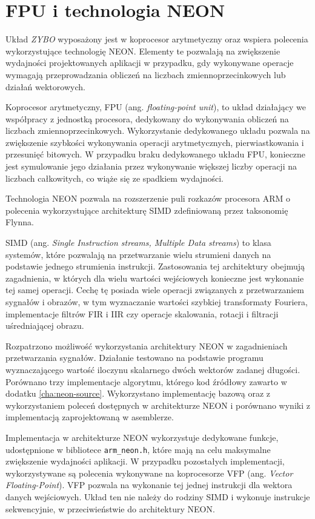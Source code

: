 \section{FPU i technologia NEON}
\label{sec:arm-neon}
Układ \emph{ZYBO} wyposażony jest w koprocesor arytmetyczny oraz wspiera polecenia wykorzystujące technologię NEON. \cite{neon-home} Elementy te pozwalają na zwiększenie wydajności projektowanych aplikacji w przypadku, gdy wykonywane operacje wymagają przeprowadzania obliczeń na liczbach zmiennoprzecinkowych lub działań wektorowych.

Koprocesor arytmetyczny, FPU (ang. \emph{floating-point unit}), to układ działający we współpracy z jednostką procesora, dedykowany do wykonywania obliczeń na liczbach zmiennoprzecinkowych. Wykorzystanie dedykowanego układu pozwala na zwiększenie szybkości wykonywania operacji arytmetycznych, pierwiastkowania i przesunięć bitowych. W przypadku braku dedykowanego układu FPU, konieczne jest symulowanie jego działania przez wykonywanie większej liczby operacji na liczbach całkowitych, co wiąże się ze spadkiem wydajności.

Technologia NEON pozwala na rozszerzenie puli rozkazów procesora ARM o polecenia wykorzystujące architekturę SIMD zdefiniowaną przez taksonomię Flynna.\cite{Flynn1972}

SIMD (ang. \emph{Single Instruction streams, Multiple Data streams}) to klasa systemów, które pozwalają na przetwarzanie wielu strumieni danych na podstawie jednego strumienia instrukcji. Zastosowania tej architektury obejmują zagadnienia, w których dla wielu wartości wejściowych konieczne jest wykonanie tej samej operacji. Cechę tę posiada wiele operacji związanych z przetwarzaniem sygnałów i obrazów, w tym  wyznaczanie wartości szybkiej transformaty Fouriera, implementacje filtrów FIR i IIR czy operacje skalowania, rotacji i filtracji uśredniającej obrazu.

Rozpatrzono możliwość wykorzystania architektury NEON w zagadnieniach przetwarzania sygnałów. Działanie testowano na podstawie programu wyznaczającego wartość iloczynu skalarnego dwóch wektorów zadanej długości. Porównano trzy implementacje algorytmu, którego kod źródłowy zawarto w dodatku \ref{cha:neon-source}.
Wykorzystano implementację bazową oraz z wykorzystaniem poleceń dostępnych w architekturze NEON i porównano wyniki z implementacją zaprojektowaną w asemblerze.

Implementacja w architekturze NEON wykorzystuje dedykowane funkcje, udostępnione w bibliotece \texttt{arm\_neon.h}, które mają na celu maksymalne zwiększenie wydajności aplikacji. W przypadku pozostałych implementacji, wykorzystywane są polecenia wykonywane na koprocesorze VFP (ang. \emph{Vector Floating-Point}). VFP pozwala na wykonanie tej jednej instrukcji dla wektora danych wejściowych. Układ ten nie należy do rodziny SIMD i wykonuje instrukcje sekwencyjnie, w przeciwieństwie do architektury NEON.


